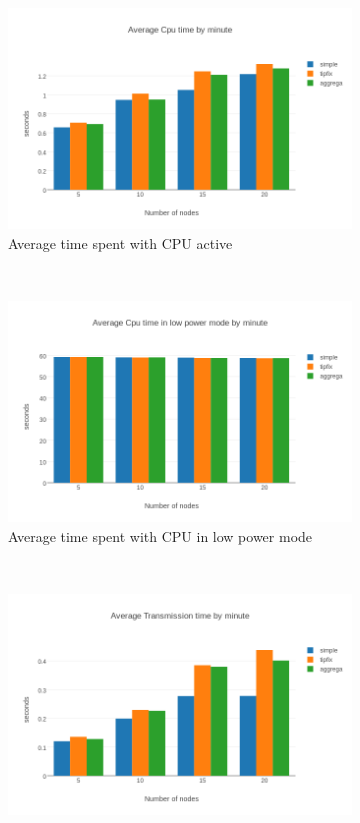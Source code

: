 \begin{figure}[h]
    \centering
    \begin{subfigure}[b]{0.45\textwidth}
        \includegraphics[width=\textwidth]{res/average_cpu}
        \caption{Average time spent with CPU active}
        \label{fig:cpu_time}
    \end{subfigure}
    ~
    \begin{subfigure}[b]{0.45\textwidth}
        \includegraphics[width=\textwidth]{res/average_lpm}
        \caption{Average time spent with CPU in low power mode}
        \label{fig:lpm_time}
    \end{subfigure}
    ~
    \begin{subfigure}[b]{0.45\textwidth}
        \includegraphics[width=\textwidth]{res/average_tx}

\end{subfigure}
\end{figure}

